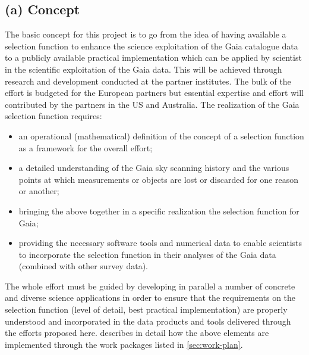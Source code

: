 \subsection{(a) Concept}
\label{sec:concept}

The basic concept for this project is to go from the idea of having available a selection function to enhance the science exploitation of the Gaia catalogue data to a publicly available practical implementation which can be applied by scientist in the scientific exploitation of the Gaia data. This will be achieved through research and development conducted at the partner institutes. The bulk of the effort is budgeted for the European partners but essential expertise and effort will contributed by the partners in the US and Australia. The realization of the Gaia selection function requires: 
\begin{itemize}
    \item an operational (mathematical) definition of the concept of a selection function as a framework for the overall effort;
    \item a detailed understanding of the Gaia sky scanning history and the various points at which measurements or objects are lost or discarded for one reason or another;
    \item bringing the above together in a specific realization the selection function for Gaia;
    \item providing the necessary software tools and numerical data to enable scientists to incorporate the selection function in their analyses of the Gaia data (combined with other survey data).
\end{itemize}
The whole effort must be guided by developing in parallel a number of concrete and diverse science applications in order to ensure that the requirements on the selection function (level of detail, best practical implementation) are properly understood and incorporated in the data products and tools delivered through the efforts proposed here.  describes in detail how the above elements are implemented through the work packages listed in \ref{sec:work-plan}.

